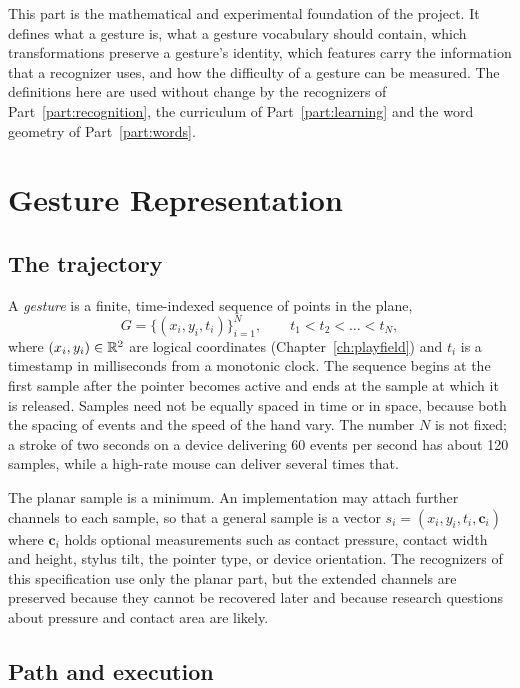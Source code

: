 This part is the mathematical and experimental foundation of the project. It defines what a gesture is, what a gesture vocabulary should contain, which transformations preserve a gesture's identity, which features carry the information that a recognizer uses, and how the difficulty of a gesture can be measured. The definitions here are used without change by the recognizers of Part~\ref{part:recognition}, the curriculum of Part~\ref{part:learning} and the word geometry of Part~\ref{part:words}.

\chapter{Gesture Representation}\label{ch:gesture-representation}

\section{The trajectory}

A \emph{gesture} is a finite, time-indexed sequence of points in the plane,
\[
G=\{(x_i,y_i,t_i)\}_{i=1}^{N},\qquad t_1<t_2<\dots<t_N,
\]
where $(x_i,y_i)\in\mathbb{R}^2$ are logical coordinates (Chapter~\ref{ch:playfield}) and $t_i$ is a timestamp in milliseconds from a monotonic clock. The sequence begins at the first sample after the pointer becomes active and ends at the sample at which it is released. Samples need not be equally spaced in time or in space, because both the spacing of events and the speed of the hand vary. The number $N$ is not fixed; a stroke of two seconds on a device delivering 60 events per second has about 120 samples, while a high-rate mouse can deliver several times that.

The planar sample is a minimum. An implementation may attach further channels to each sample, so that a general sample is a vector $s_i=(x_i,y_i,t_i,\mathbf{c}_i)$ where $\mathbf{c}_i$ holds optional measurements such as contact pressure, contact width and height, stylus tilt, the pointer type, or device orientation. The recognizers of this specification use only the planar part, but the extended channels are preserved because they cannot be recovered later and because research questions about pressure and contact area are likely.\evS

\section{Path and execution}

